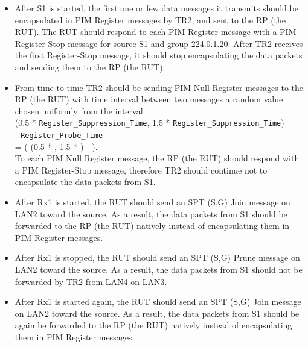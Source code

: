 \documentclass[11pt]{report}
\begin{document}
\begin{itemize}

  \item After S1 is started, the first one or few data messages it transmits
  should be encapsulated in PIM Register messages by TR2, and sent to the RP
  (the RUT). The RUT should respond to each PIM Register message with a PIM
  Register-Stop message for source S1 and group 224.0.1.20. After TR2 receives
  the first Register-Stop message, it should stop encapsulating the data
  packets and sending them to the RP (the RUT).

  \item From time to time TR2 should be sending PIM Null Register
  messages to the RP (the RUT) with time interval between two messages a random
  value chosen uniformly from the interval \\
  (0.5 * \verb=Register_Suppression_Time=,
  1.5 * \verb=Register_Suppression_Time=) \\
  - \verb=Register_Probe_Time= \\
  = ( (0.5 * {\PimsmRegisterSuppressionTime}, 1.5 *
  {\PimsmRegisterSuppressionTime}) - {\PimsmRegisterProbeTime} ). \\
  To each PIM Null Register message, the RP (the RUT) should respond with a
  PIM Register-Stop message, therefore TR2 should continue not to
  encapsulate the data packets from S1.

  \item After Rx1 is started, the RUT should send an SPT (S,G) Join message
  on LAN2 toward the source. As a result, the data packets from S1 should be
  forwarded to the RP (the RUT) natively instead of encapsulating them in PIM
  Register messages.

  \item After Rx1 is stopped, the RUT should send an SPT (S,G) Prune message
  on LAN2 toward the source. As a result, the data packets from S1 should not
  be forwarded by TR2 from LAN4 on LAN3.

  \item After Rx1 is started again, the RUT should send an SPT (S,G) Join
  message on LAN2 toward the source. As a result, the data packets from S1
  should be again be forwarded to the RP (the RUT) natively instead of
  encapsulating them in PIM Register messages.

\end{itemize}

\end{document}
